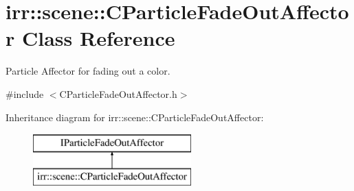 \hypertarget{classirr_1_1scene_1_1_c_particle_fade_out_affector}{\section{irr\-:\-:scene\-:\-:C\-Particle\-Fade\-Out\-Affector Class Reference}
\label{classirr_1_1scene_1_1_c_particle_fade_out_affector}
}


Particle Affector for fading out a color.  




{\ttfamily \#include $<$C\-Particle\-Fade\-Out\-Affector.\-h$>$}

Inheritance diagram for irr\-:\-:scene\-:\-:C\-Particle\-Fade\-Out\-Affector\-:\begin{figure}[H]
\begin{center}
\leavevmode
\includegraphics[height=2.000000cm]{classirr_1_1scene_1_1_c_particle_fade_out_affector}
\end{center}
\end{figure}
